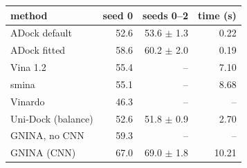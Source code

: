 \begin{tabular}{@{}lrrr@{}}
\toprule
method & seed 0 & seeds 0--2 & time (s) \\
\midrule
ADock default & 52.6 & 53.6 $\pm$ 1.3 & 0.22 \\
ADock fitted & 58.6 & 60.2 $\pm$ 2.0 & 0.19 \\
Vina 1.2 & 55.4 & -- & 7.10 \\
smina & 55.1 & -- & 8.68 \\
Vinardo & 46.3 & -- & -- \\
Uni-Dock (balance) & 52.6 & 51.8 $\pm$ 0.9 & 2.70 \\
GNINA, no CNN & 59.3 & -- & -- \\
GNINA (CNN) & 67.0 & 69.0 $\pm$ 1.8 & 10.21 \\
\bottomrule
\end{tabular}
